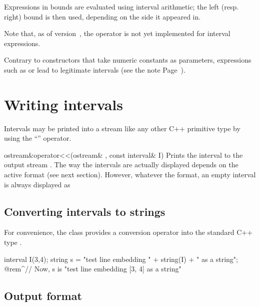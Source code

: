 \documentclass{manual}
\begin{document}
Expressions in bounds are evaluated using interval arithmetic; the left (resp. right)
bound is then used, depending on the side it appeared in.

Note that, as of version~\version, the  operator is not yet implemented for interval
expressions.

Contrary to constructors that take numeric constants as parameters, expressions such as  or  lead to legitimate intervals (see the note Page~\pageref{par:inf_inf_note}).

\section{Writing intervals}

Intervals may be printed into a stream like any other C++ primitive type
by using the ``\code{<{}<}'' operator.

\begin{deffun}{ostream\&}{operator<{}<}{(ostream\& , const interval\& I)}
Prints the interval  to the output stream . The way the intervals
are actually displayed depends on the active format (see next section).
However, whatever the format, an empty interval is always displayed as \code{[empty]}
%
%
\end{deffun}

\subsection{Converting intervals to strings}

For convenience, the  class provides a conversion operator
into the standard C++ type .
%

\begin{example}
  interval I(3,4);
  string s = "test line embedding " + string(I) + " as a string";
  @rem^// Now, s is "test line embedding [3, 4] as a string"~
\end{example}

\subsection{Output format}\label{sec:output-format}
\end{document}
